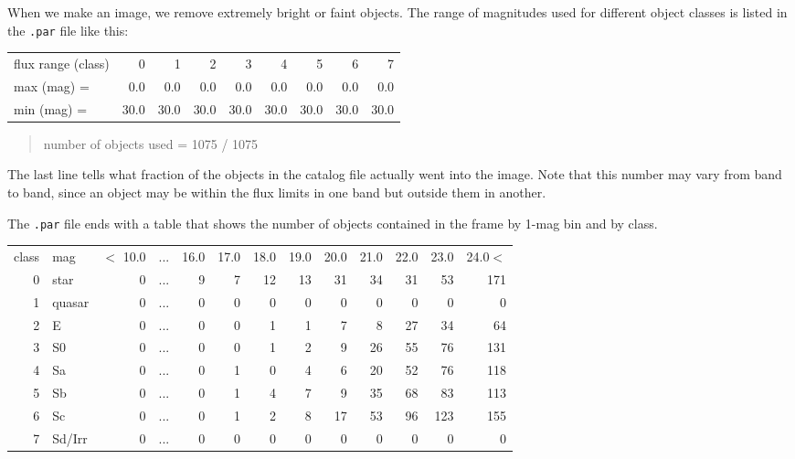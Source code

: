 When we make an image, we remove extremely bright or faint objects.
The range of magnitudes used for different object classes is listed in 
the {\tt .par} file like this:

\begin{tabular}{lrrrrrrrr} 
flux range (class)  &   0 &    1 &    2 &    3 &    4 &    5 &    6  &   7 \\

 max (mag)        = &  0.0&   0.0&   0.0&   0.0&   0.0&   0.0&   0.0 &  0.0 \\

 min (mag)        = & 30.0&  30.0&  30.0&  30.0&  30.0&  30.0&  30.0 & 30.0 \\
\end{tabular} 
\begin{quote} 
number of objects used =   1075 /   1075  
\end{quote} 
The last line tells what fraction of the objects in the catalog file
actually went into the image.  Note that this number may vary from band 
to band, since an object may be within the flux limits in one band
but outside them in another.

The {\tt .par} file ends with a table that
shows the number of objects contained in the frame 
by 1-mag bin and by class.

\begin{tabular} {rlrcrrrrrrrrr}
 class & mag &$<$  10.0& ...&  16.0&  17.0&  18.0&  19.0&  20.0&  21.0  &22.0&  23.0&  24.0$<$ \\

    0& star   & 0 &...&  9 &   7  & 12  & 13  & 31  & 34 &  31  & 53  &171\\

    1& quasar & 0 &...&  0 &   0  &  0  &  0  &  0  &  0 &   0  &  0  &  0\\

    2& E      & 0 &...&  0 &   0  &  1  &  1  &  7  &  8 &  27  & 34  & 64\\

    3& S0     & 0 &...&  0 &   0  &  1  &  2  &  9  & 26 &  55  & 76  &131\\

    4& Sa     & 0 &...&  0 &   1  &  0  &  4  &  6  & 20 &  52  & 76  &118\\

    5& Sb     & 0 &...&  0 &   1  &  4  &  7  &  9  & 35 &  68  & 83  &113\\

    6& Sc     & 0 &...&  0 &   1  &  2  &  8  & 17  & 53 &  96  &123  &155\\

    7& Sd/Irr & 0 &...&  0 &   0  &  0  &  0  &  0  &  0 &   0  &  0  &  0\\

\end{tabular} 

